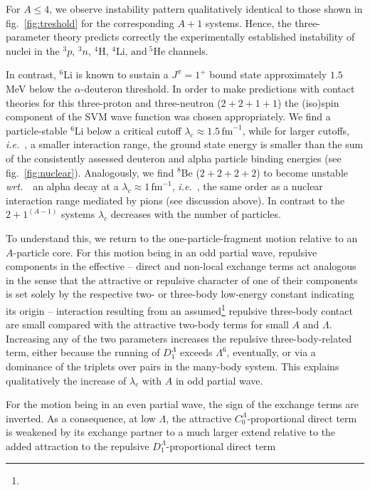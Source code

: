 \documentclass[preprint,12pt]{elsarticle}
\newcommand{\lc}{\ensuremath{\lambda_c}}
\newcommand{\fm}{\ensuremath{\,\text{fm}^{-1}}}
\newcommand{\abb}{\ensuremath{2\!+\!1^{(A-1)}}}
\newcommand{\wrt}{\textit{wrt.}~}
\newcommand{\ie}{\textit{i.e.}~}
\newcommand{\figref}[1]{fig.~\ref{#1}}
\begin{document}
For $A\le 4$, we observe instability pattern qualitatively identical to
those shown in \figref{fig:treshold} for the corresponding $A+1$ systems.
Hence, the three-parameter theory predicts correctly the experimentally
established instability of nuclei in the
$^3p,\,^3n,\,^4\text{H},\,^4\text{Li},\,\text{and}~^5\text{He}$ channels.


In contrast, $^6$Li is known to sustain a $J^\pi=1^+ $ bound state
approximately $1.5~$MeV below the $\alpha$-deuteron threshold.
In order to make predictions with contact theories for this
three-proton and three-neutron ($2+2+1+1$) the (iso)spin component of the SVM
wave function was chosen appropriately.
We find a particle-stable $^6$Li below a critical cutoff
$\lc\approx1.5\fm$, while for larger cutoffs,
\ie, a smaller interaction range, the ground state energy is
smaller than the sum of the consistently assessed deuteron and alpha particle binding
energies (see \figref{fig:nuclear}).
Analogously, we find $^8$Be ($2+2+2+2$) to become unstable \wrt~an alpha decay at a
$\lc\approx 1\fm$, \ie, the same order as a nuclear interaction
range mediated by pions (see discussion above).
In contrast to the $\abb$ systems $\lc$ decreases with the number of particles.

To understand this, we return to the one-particle-fragment motion relative to an $A$-particle core. 
For this motion being in an odd partial wave, repulsive components in
the effective -- direct and non-local exchange terms act analogous in the sense that the attractive
or repulsive character of one of their components is set solely by the respective two- or three-body
low-energy constant indicating its origin -- interaction resulting from an assumed\footnote{} repulsive
three-body contact are small compared with the attractive two-body terms for small $A$ and $\Lambda$.
Increasing any of the two parameters increases the repulsive three-body-related term, either because
the running of $D_1^\Lambda$ exceeds $\Lambda^6$, eventually, or via a dominance of the triplets over
pairs in the many-body system. This explains qualitatively the increase of $\lc$ with $A$ in odd partial
wave.

For the motion being in an even partial wave, the sign of the exchange terms are inverted. As a consequence,
at low $\Lambda$, the attractive $C_0^\Lambda$-proportional direct term is weakened by its exchange
partner to a much larger extend relative to the added attraction to the repulsive $D_1^\Lambda$-proportional
direct term
\end{document}
